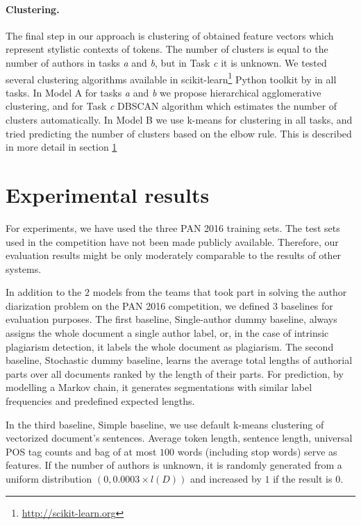 \documentclass[10pt, a4paper]{article}
\begin{document}
\paragraph{Clustering.}
The final step in our approach is clustering of obtained feature vectors which represent stylistic contexts of tokens. The number of clusters is equal to the number of authors in tasks \emph{a} and \emph{b}, but in Task \emph{c} it is unknown. We tested several clustering algorithms available in scikit-learn\footnote{\url{http://scikit-learn.org}} Python toolkit by \citet{scikit-learn} in all tasks. In Model A for tasks  \emph{a} and \emph{b} we propose hierarchical agglomerative clustering, and for Task \emph{c} DBSCAN algorithm which estimates the number of clusters automatically. In Model B we use k-means for clustering in all tasks, and tried predicting the number of clusters based on the elbow rule. This is described in more detail in section \ref{sec:experimental-results}



\section{Experimental results} \label{sec:experimental-results}

For experiments, we have used the three PAN 2016 training sets. The test sets used in the competition have not been made publicly available. Therefore, our evaluation results might be only moderately comparable to the results of other systems.

In addition to the $2$ models from the teams that took part in solving the author diarization problem on the PAN 2016 competition, we defined $3$ baselines for evaluation purposes. The first baseline, Single-author dummy baseline, always assigns the whole document a single author label, or, in the case of intrinsic plagiarism detection, it labels the whole document as plagiarism. The second baseline, Stochastic dummy baseline, learns the average total lengths of authorial parts over all documents ranked by the length of their parts. For prediction, by modelling a Markov chain, it generates segmentations with similar label frequencies and predefined expected lengths.

In the third baseline, Simple baseline, we use default k-means clustering of vectorized document's sentences. Average token length, sentence length, universal POS tag counts and bag of at most $100$ words (including stop words) serve as features. If the number of authors is unknown, it is randomly generated from a uniform distribution $(0,0.0003\times{l(D)})$ and increased by $1$ if the result is $0$.
\end{document}
